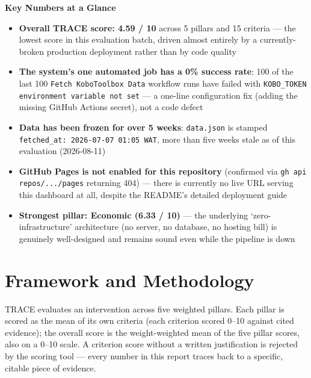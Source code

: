 \documentclass[12pt, a4paper]{article}
\begin{document}
\begin{mdframed}[style=keybox]
\textbf{Key Numbers at a Glance}
\begin{itemize}[noitemsep, topsep=2pt]
  \item \textbf{Overall TRACE score: 4.59 / 10} across 5 pillars and 15 criteria --- the lowest score in this evaluation batch, driven almost entirely by a currently-broken production deployment rather than by code quality
  \item \textbf{The system's one automated job has a 0\% success rate}: 100 of the last 100 \texttt{Fetch KoboToolbox Data} workflow runs have failed with \texttt{KOBO\_TOKEN environment variable not set} --- a one-line configuration fix (adding the missing GitHub Actions secret), not a code defect
  \item \textbf{Data has been frozen for over 5 weeks}: \texttt{data.json} is stamped \texttt{fetched\_at: 2026-07-07 01:05 WAT}, more than five weeks stale as of this evaluation (2026-08-11)
  \item \textbf{GitHub Pages is not enabled for this repository} (confirmed via \texttt{gh api repos/.../pages} returning 404) --- there is currently no live URL serving this dashboard at all, despite the README's detailed deployment guide
  \item \textbf{Strongest pillar: Economic (6.33 / 10)} --- the underlying `zero-infrastructure' architecture (no server, no database, no hosting bill) is genuinely well-designed and remains sound even while the pipeline is down
\end{itemize}
\end{mdframed}

\clearpage

\section{Framework and Methodology}

TRACE evaluates an intervention across five weighted pillars. Each pillar
is scored as the mean of its own criteria (each criterion scored 0--10
against cited evidence); the overall score is the weight-weighted mean of
the five pillar scores, also on a 0--10 scale. A criterion score without a
written justification is rejected by the scoring tool --- every number in
this report traces back to a specific, citable piece of evidence.
\end{document}
